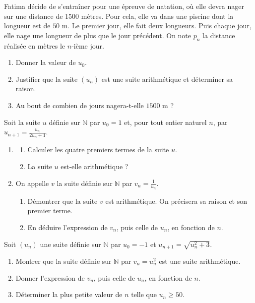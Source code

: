 \documentclass[11pt]{article}
\begin{document}
\begin{exo}
  Fatima décide de s'entraîner pour une épreuve de natation, où elle devra nager
  sur une distance de $1500$ mètres. Pour cela, elle va dans une piscine dont la
  longueur est de $50$ m. Le premier jour, elle fait deux longueurs. Puis chaque
  jour, elle nage une longueur de plus que le jour précédent. On note $p_n$ la
  distance réalisée en mètres le $n$-ième jour.
  \begin{enumerate}
    \item Donner la valeur de $u_0$.
    \item Justifier que la suite $(u_n)$ est une suite arithmétique et
      déterminer sa raison.
    \item Au bout de combien de jours nagera-t-elle $1500$ m ?
  \end{enumerate}
\end{exo}

\begin{exo}
  Soit la suite $u$ définie sur $\mathbb{N}$ par $u_0=1$ et, pour tout entier
  naturel $n$, par $u_{n+1} = \frac{u_n}{2u_n+1}$.
  \begin{enumerate}
    \item \begin{enumerate}
        \item Calculer les quatre premiers termes de la suite $u$.
        \item La suite $u$ est-elle arithmétique ?
      \end{enumerate}
    \item On appelle $v$ la suite définie sur $\mathbb{N}$ par
      $v_n=\frac{1}{u_n}$.
      \begin{enumerate}
        \item Démontrer que la suite $v$ est arithmétique. On précisera sa
          raison et son premier terme.
        \item En déduire l'expression de $v_n$, puis celle de $u_n$, en fonction
          de $n$.
      \end{enumerate}
  \end{enumerate}
\end{exo}

\begin{exo}
  Soit $\left( u_n \right)$ une suite définie sur $\mathbb{N}$ par $u_0=-1$ et
  $u_{n+1}=\sqrt{u_n^2+3}$.
  \begin{enumerate}
    \item Montrer que la suite définie sur $\mathbb{N}$ par $v_n = u_n^2$ est
      une suite arithmétique.
    \item Donner l'expression de $v_n$, puis celle de $u_n$, en fonction de $n$.
    \item Déterminer la plus petite valeur de $n$ telle que $u_n\geq50$.
  \end{enumerate}
\end{exo}
\end{document}
